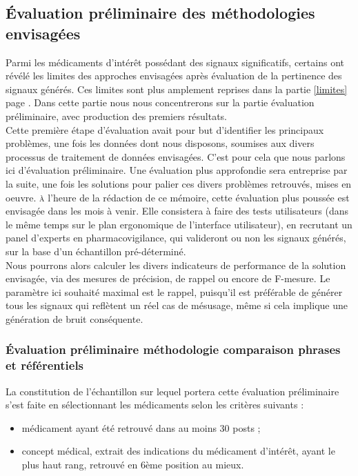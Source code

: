 \documentclass[a4paper, 12pt, openany, oneside, abstract=on]{article} %
\begin{document}
\subsection{Évaluation préliminaire des méthodologies envisagées}
Parmi les médicaments d'intérêt possédant des signaux significatifs, certains ont révélé les limites des approches envisagées après évaluation de la pertinence des signaux générés. Ces limites sont plus amplement reprises dans la partie \ref{limites} page \pageref{limites}. Dans cette partie nous nous concentrerons sur la partie évaluation préliminaire, avec production des premiers résultats.\\
Cette première étape d'évaluation avait pour but d'identifier les principaux problèmes, une fois les données dont nous disposons, soumises aux divers processus de traitement de données envisagées.
C'est pour cela que nous parlons ici d'évaluation préliminaire. Une évaluation plus approfondie sera entreprise par la suite, une fois les solutions pour palier ces divers problèmes retrouvés, mises en oeuvre. \textsc{à} l'heure de la rédaction de ce mémoire, cette évaluation plus poussée est envisagée dans les mois à venir. Elle consistera à faire des tests utilisateurs (dans le même temps sur le plan ergonomique de l'interface utilisateur), en recrutant un panel d'experts en pharmacovigilance, qui valideront ou non les signaux générés, sur la base d'un échantillon pré-déterminé.\\
Nous pourrons alors calculer les divers indicateurs de performance de la solution envisagée, via des mesures de précision, de rappel ou encore de F-mesure. Le paramètre ici souhaité maximal est le rappel, puisqu'il est préférable de générer tous les signaux qui reflètent un réel cas de mésusage, même si cela implique une génération de bruit conséquente.

\subsubsection{Évaluation préliminaire méthodologie comparaison phrases et référentiels}
\label{EvalRank}
La constitution de l'échantillon sur lequel portera cette évaluation préliminaire s'est faite en sélectionnant les médicaments selon les critères suivants :
\begin{itemize}
    \item médicament ayant été retrouvé dans au moins 30 posts ;
    \item concept médical, extrait des indications du médicament d'intérêt, ayant le plus haut rang, retrouvé en 6ème position au mieux.
\end{itemize}
\end{document}
